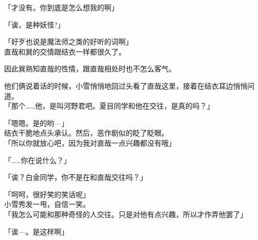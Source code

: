 「才没有。你到底是怎么想我的啊」

「诶，是种妖怪?」

「好歹也说是魔法师之类的好听的词啊」\\

直哉和巽的交情跟结衣一样都很久了。

因此巽熟知直哉的性情，跟直哉相处时也不怎么客气。

他们俩说着话的时候，小雪悄悄地回过头看了直哉这里，接着在结衣耳边悄悄问道。\\

「那个……他，是叫河野君吧。夏目同学和他在交往，是真的吗？」

「嗯嗯。是的哟—」\\

结衣干脆地点头承认。然后，恶作剧似的眨了眨眼。\\

「所以你就放心吧，因为我对直哉一点兴趣都没有哦」

「……你在说什么？」

「诶？白金同学，你不是在和直哉交往吗？」

「呵呵，很好笑的笑话呢」\\

小雪秀发一甩，自信一笑。\\

「我怎么可能和那种奇怪的人交往。只是对他有点兴趣，所以才作弄他罢了」

「诶—。是这样啊」\\

